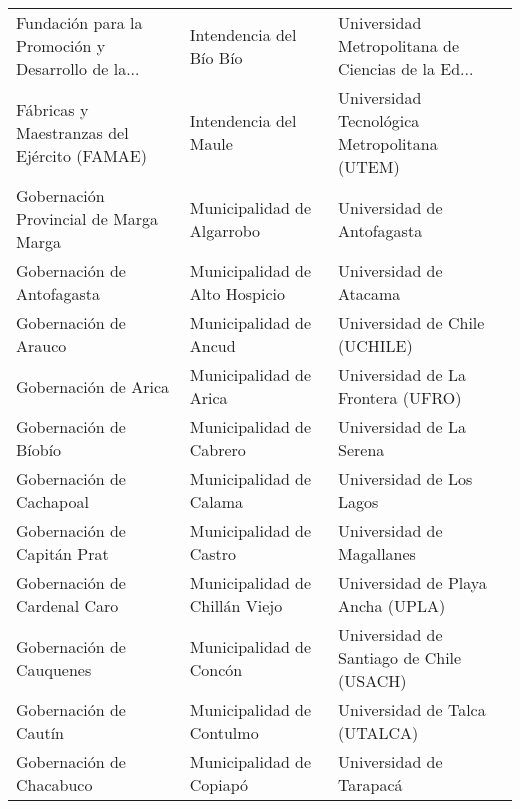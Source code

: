 \documentclass[11pt]{article}
\begin{document}
\begin{longtable}{ p{5cm} | p{5cm} | p{5cm} }
 Fundación para la Promoción y Desarrollo de la... &                            Intendencia del Bío Bío &  Universidad Metropolitana de Ciencias de la Ed... \\
       Fábricas y Maestranzas del Ejército (FAMAE) &                              Intendencia del Maule &       Universidad Tecnológica Metropolitana (UTEM) \\
             Gobernación Provincial de Marga Marga &                         Municipalidad de Algarrobo &                         Universidad de Antofagasta \\
                        Gobernación de Antofagasta &                     Municipalidad de Alto Hospicio &                             Universidad de Atacama \\
                             Gobernación de Arauco &                             Municipalidad de Ancud &                      Universidad de Chile (UCHILE) \\
                              Gobernación de Arica &                             Municipalidad de Arica &                  Universidad de La Frontera (UFRO) \\
                             Gobernación de Bíobío &                           Municipalidad de Cabrero &                           Universidad de La Serena \\
                          Gobernación de Cachapoal &                            Municipalidad de Calama &                           Universidad de Los Lagos \\
                       Gobernación de Capitán Prat &                            Municipalidad de Castro &                          Universidad de Magallanes \\
                      Gobernación de Cardenal Caro &                     Municipalidad de Chillán Viejo &                  Universidad de Playa Ancha (UPLA) \\
                          Gobernación de Cauquenes &                            Municipalidad de Concón &           Universidad de Santiago de Chile (USACH) \\
                             Gobernación de Cautín &                          Municipalidad de Contulmo &                      Universidad de Talca (UTALCA) \\
                          Gobernación de Chacabuco &                           Municipalidad de Copiapó &                            Universidad de Tarapacá \\

\end{longtable}
\end{document}
